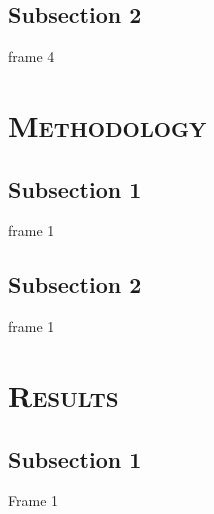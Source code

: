 \documentclass[xcolor=x11names,compress]{beamer}
\begin{document}
\subsection{Subsection 2}
\begin{frame}{frame 4}

\end{frame}


\section{\scshape Methodology}
\subsection{Subsection 1}
\begin{frame}{frame 1}

\end{frame}


\subsection{Subsection 2}
\begin{frame}{frame 1}

\end{frame}

\section{\scshape Results}
\subsection{Subsection 1}
\begin{frame}{Frame 1}

\end{frame}
\end{document}
